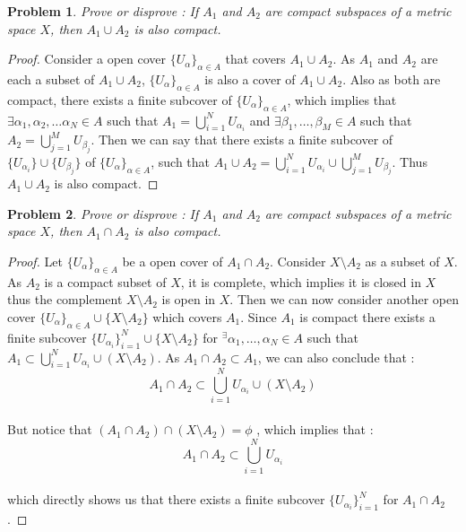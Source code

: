 \documentclass[paper=a4, fontsize=11pt]{scrartcl}
\newtheorem{problem}{Problem}
\begin{document}
\begin{problem}
	Prove or disprove : If $A_1$ and $A_2$ are compact subspaces of a metric space $X$, then $A_1 \cup A_2$ is also compact.
\end{problem}

\begin{proof}
	Consider a open cover $\{U_\alpha\}_{\alpha \in A}$ that covers $A_1 \cup A_2$. As $A_1$ and $A_2$ are each a subset of $A_1 \cup A_2$, $\{U_\alpha\}_{\alpha \in A}$ is also a cover of $A_1 \cup A_2$. Also as both are compact, there exists a finite subcover of $\{U_\alpha\}_{\alpha \in A}$, which implies that $\exists \alpha_1, \alpha_2, \dots \alpha_N \in A$ such that $A_1 = \bigcup\limits_{i=1}^N U_{\alpha_i}$ and $\exists \beta_1,\dots,\beta_M \in A$ such that $A_2 = \bigcup\limits_{j=1}^M U_{\beta_j}$. Then we can say that there exists a finite subcover of $\{U_{\alpha_i}\} \cup \{U_{\beta_j}\}$ of $\{U_\alpha\}_{\alpha \in A}$, such that $A_1 \cup A_2 =  \bigcup\limits_{i=1}^N U_{\alpha_i} \cup \bigcup\limits_{j=1}^M U_{\beta_j}$. Thus $A_1 \cup A_2 $ is also compact.
\end{proof}

\begin{problem}
	Prove or disprove : If $A_1$ and $A_2$ are compact subspaces of a metric space $X$, then $A_1 \cap A_2$ is also compact.
\end{problem}

\begin{proof}
Let $\{U_\alpha\}_{\alpha\in A}$ be a open cover of $A_1 \cap A_2$. Consider $X\setminus A_2$ as a subset of $X$. As $A_2$ is a compact subset of $X$, it is complete, which implies it is closed in $X$ thus the complement $X \setminus A_2$ is open in $X$. Then we can now consider another open cover $\{U_\alpha\}_{\alpha\in A} \cup \{X \setminus A_2\}$ which covers $A_1$. Since $A_1$ is compact there exists a finite subcover $\{U_{\alpha_i}\}_{i=1}^N \cup \{X \setminus A_2\}$ for $^\exists \alpha_1,\dots,\alpha_N \in A$ such that $A_1 \subset \bigcup\limits_{i=1}^N U_{\alpha_i} \cup (X \setminus A_2)$. As $A_1 \cap A_2 \subset A_1$, we can also conclude that :\\

\begin{equation}\nonumber
	A_1 \cap A_2 \subset \bigcup\limits_{i=1}^N U_{\alpha_i} \cup (X \setminus A_2)
\end{equation}\\

But notice that $(A_1 \cap A_2) \cap (X \setminus A_2) = \phi$ , which implies that : \\

\begin{equation}\nonumber
		A_1 \cap A_2 \subset \bigcup\limits_{i=1}^N U_{\alpha_i}
\end{equation}\\

which directly shows us that there exists a finite subcover $\{U_{\alpha_i}\}_{i=1}^N$ for $A_1 \cap A_2$. 
\end{proof}
\end{document}
